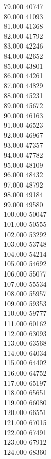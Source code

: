 { 79.000	40747 \\
 80.000	41093 \\
 81.000	41368 \\
 82.000	41792 \\
 83.000	42246 \\
 84.000	42652 \\
 85.000	43801 \\
 86.000	44261 \\
 87.000	44829 \\
 88.000	45231 \\
 89.000	45672 \\
 90.000	46163 \\
 91.000	46523 \\
 92.000	46967 \\
 93.000	47357 \\
 94.000	47782 \\
 95.000	48109 \\
 96.000	48432 \\
 97.000	48792 \\
 98.000	49184 \\
 99.000	49580 \\
 100.000	50047 \\
 101.000	50555 \\
 102.000	53292 \\
 103.000	53748 \\
 104.000	54214 \\
 105.000	54692 \\
 106.000	55077 \\
 107.000	55534 \\
 108.000	55957 \\
 109.000	59353 \\
 110.000	59777 \\
 111.000	60162 \\
 112.000	63093 \\
 113.000	63568 \\
 114.000	64034 \\
 115.000	64402 \\
 116.000	64752 \\
 117.000	65197 \\
 118.000	65651 \\
 119.000	66080 \\
 120.000	66551 \\
 121.000	67015 \\
 122.000	67491 \\
 123.000	67912 \\
 124.000	68360 \\
}
